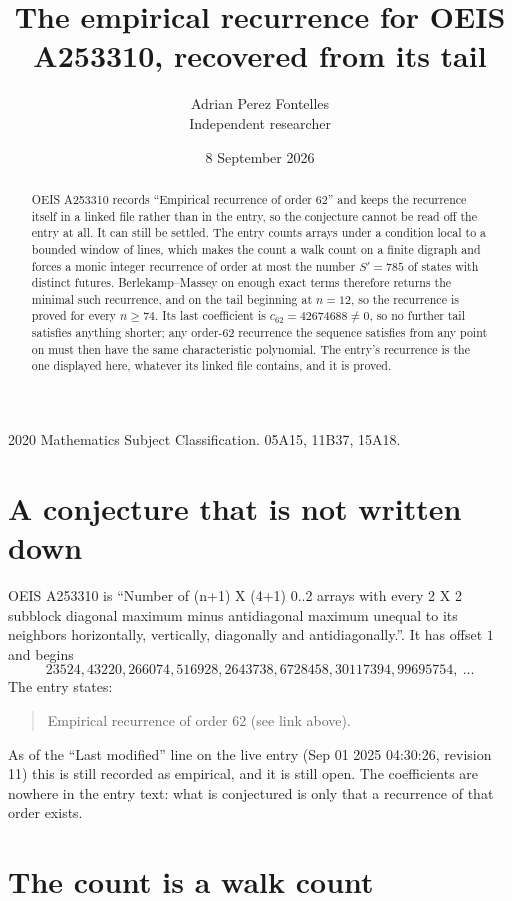 \documentclass[11pt,a4paper]{article}
\title{The empirical recurrence for OEIS A253310, recovered from its tail}
\author{Adrian Perez Fontelles\\ \small Independent researcher}
\date{8 September 2026}
\theoremstyle{plain}
\theoremstyle{definition}
\begin{document}
\maketitle

\begin{abstract}
OEIS A253310 records ``Empirical recurrence of order $62$'' and keeps the recurrence itself in
a linked file rather than in the entry, so the conjecture cannot be read off the entry at all.
It can still be settled. The entry counts arrays under a condition local to a bounded window of
lines, which makes the count a walk count on a finite digraph and forces a monic integer
recurrence of order at most the number $S'=785$ of states with distinct futures. Berlekamp--Massey on
enough exact terms therefore returns the minimal such recurrence, and on the tail beginning at $n=12$, so the recurrence is proved for every $n\ge74$.
Its last coefficient is $c_{62}=42674688\neq0$, so no further tail satisfies anything
shorter; any order-$62$ recurrence the sequence satisfies from any point on must then have
the same characteristic polynomial. The entry's recurrence is the one displayed here, whatever
its linked file contains, and it is proved.
\end{abstract}

\noindent\small 2020 Mathematics Subject Classification. 05A15, 11B37, 15A18.\normalsize

\section{A conjecture that is not written down}

OEIS A253310 is ``Number of (n+1) X (4+1) 0..2 arrays with every 2 X 2 subblock diagonal maximum minus antidiagonal maximum unequal to its neighbors horizontally, vertically, diagonally and antidiagonally.''. It has offset $1$ and begins
\[
23524, 43220, 266074, 516928, 2643738, 6728458, 30117394, 99695754,\ \dots
\]
The entry states:
\begin{quote}
Empirical recurrence of order 62 (see link above).
\end{quote}
As of the ``Last modified'' line on the live entry (Sep 01 2025 04:30:26, revision 11)
this is still recorded as empirical, and it is still open. The coefficients are nowhere in the
entry text: what is conjectured is only that a recurrence of that order exists.

\section{The count is a walk count}
\end{document}
